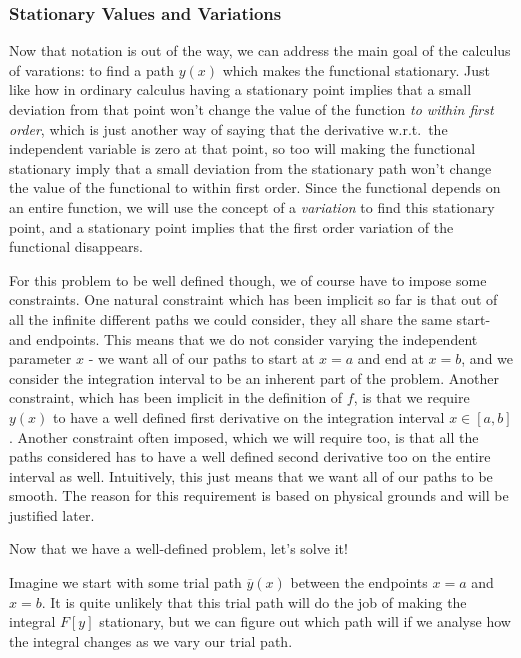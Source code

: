 \documentclass[a4paper]{article}
\begin{document}
    \subsubsection{Stationary Values and Variations}

    Now that notation is out of the way, we can address the main goal of the calculus of varations: to find a path \(y(x)\) which makes the functional stationary. Just like how in ordinary calculus having a stationary point implies that a small deviation from that point won't change the value of the function \textit{to within first order}, which is just another way of saying that the derivative w.r.t.\ the independent variable is zero at that point, so too will making the functional stationary imply that a small deviation from the stationary path won't change the value of the functional to within first order. Since the functional depends on an entire function, we will use the concept of a \textit{variation} to find this stationary point, and a stationary point implies that the first order variation of the functional disappears.

    For this problem to be well defined though, we of course have to impose some constraints. One natural constraint which has been implicit so far is that out of all the infinite different paths we could consider, they all share the same start- and endpoints. This means that we do not consider varying the independent parameter \(x\) - we want all of our paths to start at \(x = a\) and end at \(x = b\), and we consider the integration interval to be an inherent part of the problem. Another constraint, which has been implicit in the definition of \(f\), is that we require \(y(x)\) to have a well defined first derivative on the integration interval \(x \in [a, b]\). Another constraint often imposed, which we will require too, is that all the paths considered has to have a well defined second derivative too on the entire interval as well. Intuitively, this just means that we want all of our paths to be smooth. The reason for this requirement is based on physical grounds and will be justified later.

    Now that we have a well-defined problem, let's solve it!

    Imagine we start with some trial path \(\overline{y}(x)\) between the endpoints \(x = a\) and \(x = b\). It is quite unlikely that this trial path will do the job of making the integral \(F[y]\) stationary, but we can figure out which path will if we analyse how the integral changes as we vary our trial path. 
    
\end{document}
